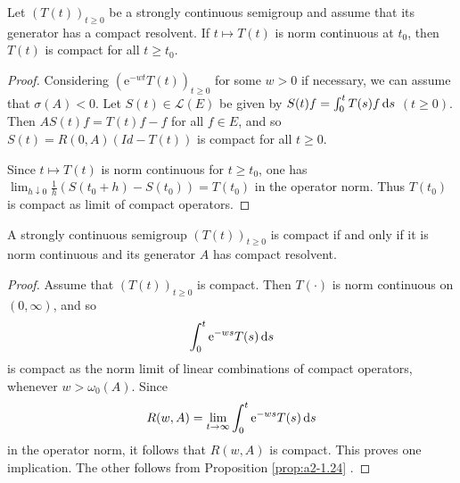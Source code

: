 \begin{proposition}\label{prop:a2-1.24}
Let $(T(t))_{t\geq 0}$ be a strongly continuous semigroup and assume that its generator has a compact resolvent.
If $t \mapsto T(t)$ is norm continuous at $t_0$, then $T(t)$ is compact for all $t \geq t_0$.
\end{proposition}
\begin{proof}
Considering $(\mathrm{e}^{-wt}T(t))_{t\geq 0}$ for some $w > 0$ if necessary, we can assume that $\sigma(A) < 0$.
Let $S(t) \in \mathcal{L}(E)$ be given by 
$S(t)f = \int_0^t T(s)f \mathop{}\!\mathrm{d}{s}$ $(t \geq 0)$.
Then $AS(t)f = T(t)f - f$ for all $f \in E$, and so $S(t) = R(0,A)(Id-T(t))$ is compact for all $t \geq 0$.

Since $t \mapsto T(t)$ is norm continuous for $t \geq t_0$, one has 
$\lim_{h \downarrow 0} \frac{1}{h}(S(t_0+h)-S(t_0)) = T(t_0)$ in the operator norm.
Thus $T(t_0)$ is compact as limit of compact operators.
\end{proof}
\begin{theorem}\label{thm:a2-1.25}
A strongly continuous semigroup $(T(t))_{t\geq 0}$ is compact if and only if it is norm continuous and its generator $A$ has compact resolvent.
\end{theorem}
\begin{proof}
Assume that $(T(t))_{t\geq 0}$ is compact. Then $T(\cdot)$ is norm continuous on $(0,\infty)$, and so 
\[
    \int_{0}^{t} \mathrm{e}^{-ws} T(s) \mathop{}\!\mathrm{d}{s}
\]
is compact as the norm limit of linear combinations of compact operators, whenever $w > \omega_{0}(A)$.
Since 
\[
    R(w,A) = \lim_{t \to \infty} \int_{0}^{t} \mathrm{e}^{-ws} T(s) \mathop{}\!\mathrm{d}{s}
\]
in the operator norm, it follows that $R(w,A)$ is compact.
This proves one implication.
The other follows from Proposition \ref{prop:a2-1.24} . 
\end{proof}
